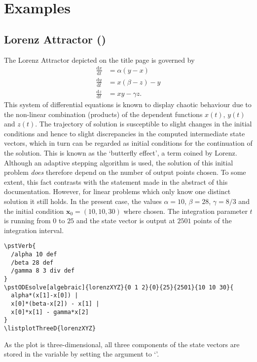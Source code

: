 \documentclass[11pt,english,BCOR10mm,DIV12,bibliography=totoc,parskip=false,smallheadings
    headexclude,footexclude,oneside,dvips,UKenglish]{pst-doc}
\begin{document}
\section{Examples}
\subsection[Lorenz Attractor]{Lorenz Attractor ()}
The Lorenz Attractor depicted on the title page is governed by
\begin{align*}
  \frac{\mathrm{d}x}{\mathrm{d}t}& = \alpha (y-x)\\
  \frac{\mathrm{d}y}{\mathrm{d}t}& = x(\beta-z)-y\\
  \frac{\mathrm{d}z}{\mathrm{d}t}& = x y - \gamma z.
\end{align*}
This system of differential equations is known to display chaotic behaviour due to the non-linear combination (products) of the dependent functions $x(t)$, $y(t)$ and $z(t)$. The trajectory of solution is susceptible to slight changes in the initial conditions and hence to slight discrepancies in the computed intermediate state vectors, which in turn can be regarded as initial conditions for the continuation of the solution. This is known as the `butterfly effect', a term coined by Lorenz. Although an adaptive stepping algorithm is used, the solution of this initial problem \emph{does} therefore depend on the number of output points chosen. To some extent, this fact contrasts with the statement made in the abstract of this documentation. However, for linear problems which only know one distinct solution it still holds. In the present case, the values $\alpha=10$, $\beta=28$, $\gamma=8/3$ and the initial condition $\mathbf{x}_0=(10,10,30)$ where chosen. The integration parameter $t$ is running from  $0$ to $25$ and the state vector is output at $2501$ points of the integration interval.

\begin{verbatim}
\pstVerb{
  /alpha 10 def
  /beta 28 def
  /gamma 8 3 div def
}
\pstODEsolve[algebraic]{lorenzXYZ}{0 1 2}{0}{25}{2501}{10 10 30}{
  alpha*(x[1]-x[0]) |
  x[0]*(beta-x[2]) - x[1] |
  x[0]*x[1] - gamma*x[2]
}
\listplotThreeD{lorenzXYZ}
\end{verbatim}
As the plot is three-dimensional, all three components of the state vectors are stored in the \PS{} variable  by setting the  argument to `'.
\end{document}
